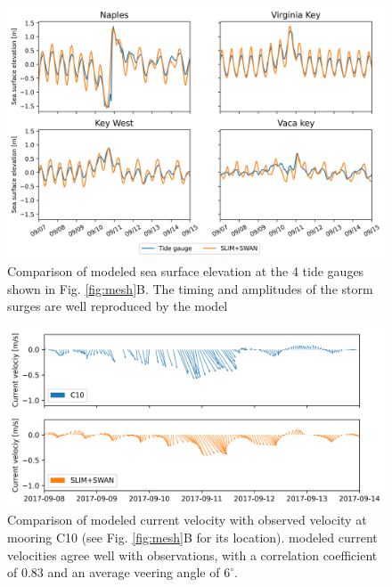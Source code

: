 \documentclass[preprint,12pt,authoryear]{elsarticle}
\begin{document}
\begin{figure}
    \centering
    \includegraphics[width=\textwidth]{fig/elevation_with_map.png}
    \caption{Comparison of modeled sea surface elevation at the 4 tide gauges shown in Fig. \ref{fig:mesh}B. The timing and amplitudes of the storm surges are well reproduced by the model}
    \label{fig:sse}
\end{figure}
\begin{figure}
    \includegraphics[width=\textwidth]{fig/validation_currents_C10_ww3.png}
    \caption{Comparison of modeled current velocity with observed velocity at mooring C10 (see Fig. \ref{fig:mesh}B for its location). modeled current velocities agree well with observations, with a correlation coefficient of 0.83 and an average veering angle of $6^\circ$.}
    \label{fig:uv}
\end{figure}
\end{document}
